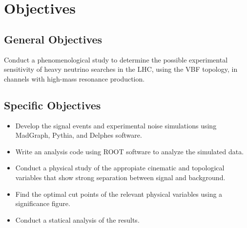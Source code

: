 \chapter{Objectives}
\section{General Objectives}

Conduct a phenomenological study to determine the possible experimental sensitivity of heavy neutrino searches in the LHC, using the VBF topology, in channels with high-mass resonance production.

\section{Specific Objectives}

\begin{itemize}
	\item Develop the signal events and experimental noise simulations using MadGraph, Pythia, and Delphes software.
	\item Write an analysis code using ROOT software to analyze the simulated data.
	\item Conduct a physical study of the appropiate cinematic and topological variables that show strong separation between signal and background.
	\item Find the optimal cut points of the relevant physical variables using a significance figure.
    \item Conduct a statical analysis of the results.
\end{itemize}
